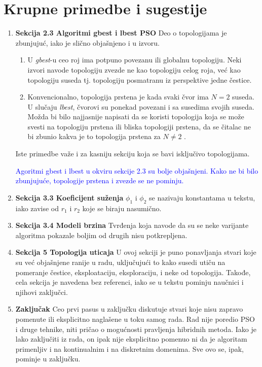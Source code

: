 \documentclass[a4paper]{report}
\newcommand{\odgovor}[1]{\textcolor{blue}{#1}}
\begin{document}
\section{Krupne primedbe i sugestije}
\begin{enumerate}
    \item \textbf{Sekcija 2.3 Algoritmi gbest i lbest PSO} Deo o topologijama je zbunjujuć, iako je slično objašnjeno i u izvoru.
    \begin{enumerate}
        \item U \textit{gbest}-u ceo roj ima potpuno povezanu ili globalnu topologiju. Neki izvori navode topologiju zvezde ne kao topologiju celog roja, već kao topologiju suseda tj. topologiju posmatranu iz perspektive jedne čestice.
        \item Konvencionalno, topologija prstena je kada svaki čvor ima $N=2$ suseda. U slučaju \textit{lbest}, čvorovi su ponekad povezani i sa susedima svojih suseda. Možda bi bilo najjasnije napisati da se koristi topologija koja se može svesti na topologiju prstena ili bliska topologiji prstena, da se čitalac ne bi zbunio kakva je to topologija prstena za $N\neq 2$ .
    \end{enumerate}
    Iste primedbe važe i za kasniju sekciju koja se bavi isključivo topologijama.
    
    
    \odgovor{Agoritmi gbest i lbest u okviru sekcije 2.3 su bolje objašnjeni. Kako ne bi bilo zbunjujuće, topologije prstena i zvezde se ne pominju. } 
    
    
    
    \item \textbf{Sekcija 3.3 Koeficijent suženja} $\phi_1$ i $\phi_2$ se nazivaju konstantama u tekstu, iako zavise od $r_1$ i $r_2$ koje se biraju nasumično.
    
    \item \textbf{Sekcija 3.4 Modeli brzina} Tvrđenja koja navode da su se neke varijante algoritma pokazale boljim od drugih nisu potkrepljena.
    
    \item \textbf{Sekcija 5 Topologija uticaja} U ovoj sekciji je puno ponavljanja stvari koje su već objašnjene ranije u radu, uključujući to kako susedi utiču na pomeranje čestice, eksploataciju, eksploraciju, i neke od topologija. Takođe, cela sekcija je navedena bez referenci, iako se u tekstu pominju naučnici i njihovi zaključci.
    
    \item \textbf{Zaključak} Ceo prvi pasus u zaključku diskutuje stvari koje nisu zapravo pomenute ili eksplicitno naglašene u toku samog rada. Rad nije poredio PSO i druge tehnike, niti pričao o mogućnosti pravljenja hibridnih metoda. Iako je lako zaključiti iz rada, on ipak nije eksplicitno pomenuo ni da je algoritam primenljiv i na kontinualnim i na diskretnim domenima. Sve ovo se, ipak, pominje u zaključku.
\end{enumerate}
\end{document}
